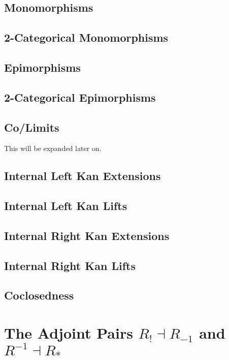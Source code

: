\subsection{Monomorphisms}\label{subsection-monomorphisms-in-rel-apartness}
\subsection{2-Categorical Monomorphisms}\label{subsection-2-categorical-monomorphisms-in-rel-apartness}
\subsection{Epimorphisms}\label{subsection-epimorphisms-in-rel-apartness}
\subsection{2-Categorical Epimorphisms}\label{subsection-2-categorical-epimorphisms-in-rel-apartness}
\subsection{Co/Limits}\label{subsection-co-limits-in-rel-apartness}
This will be expanded later on.
\subsection{Internal Left Kan Extensions}\label{subsection-internal-left-kan-extensions-in-rel-apartness}
\subsection{Internal Left Kan Lifts}\label{subsection-internal-left-kan-lifts-in-rel-apartness}
\subsection{Internal Right Kan Extensions}\label{subsection-internal-right-kan-extensions-in-rel-apartness}
\subsection{Internal Right Kan Lifts}\label{subsection-internal-right-kan-lifts-in-rel-apartness}
\subsection{Coclosedness}\label{subsection-coclosedness-of-rel-apartness}
\section{The Adjoint Pairs $R_{!}\dashv R_{-1}$ and $R^{-1}\dashv R_{*}$}\label{section-the-adjoint-pairs-r-shriek-r-minus-one-and-r-minus-one-r-star}
